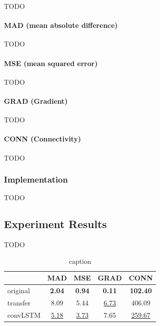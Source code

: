 \documentclass[final]{cvpr}
\begin{document}
TODO

\paragraph{MAD (mean absolute difference)}

TODO

\paragraph{MSE (mean squared error)}

TODO

\paragraph{GRAD (Gradient)}

TODO

\paragraph{CONN (Connectivity)}

TODO

\subsubsection{Implementation}

TODO

\subsection{Experiment Results}

TODO

\begin{table}
    \centering
    \caption{caption}
    \label{result}
    \begin{tabular}{lcccc}
        \toprule
        {}       & MAD              & MSE              & GRAD             & CONN               \\
        \midrule
        original & \textbf{2.04}    & \textbf{0.94}    & \textbf{0.11}    & \textbf{102.40}    \\
        \midrule
        transfer & 8.09             & 5.44             & \underline{6.73} & 406.09             \\
        convLSTM & \underline{5.18} & \underline{3.73} & 7.65             & \underline{259.67} \\
        \bottomrule
    \end{tabular}
\end{table}
\end{document}
